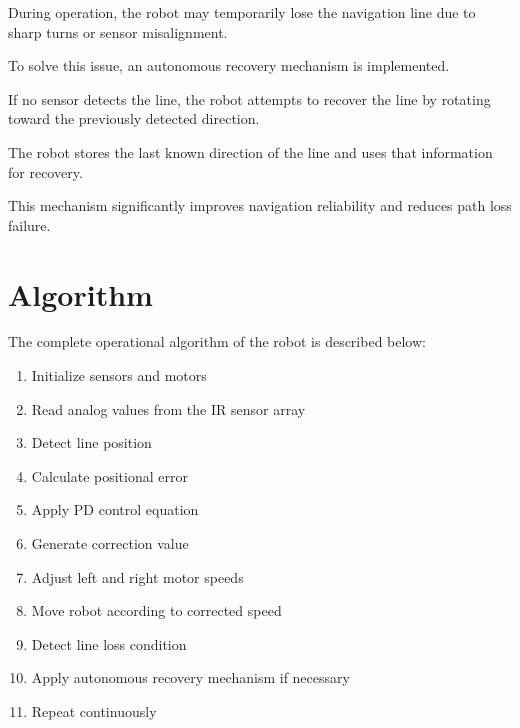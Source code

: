 \documentclass[12pt,a4paper,oneside]{report}
\begin{document}
During operation, the robot may temporarily lose the navigation line due to sharp turns or sensor misalignment.

To solve this issue, an autonomous recovery mechanism is implemented.

If no sensor detects the line, the robot attempts to recover the line by rotating toward the previously detected direction.

The robot stores the last known direction of the line and uses that information for recovery.

This mechanism significantly improves navigation reliability and reduces path loss failure.


\section{Algorithm}

The complete operational algorithm of the robot is described below:

\begin{enumerate}

\item Initialize sensors and motors

\item Read analog values from the IR sensor array

\item Detect line position

\item Calculate positional error

\item Apply PD control equation

\item Generate correction value

\item Adjust left and right motor speeds

\item Move robot according to corrected speed

\item Detect line loss condition

\item Apply autonomous recovery mechanism if necessary

\item Repeat continuously

\end{enumerate}
\end{document}
